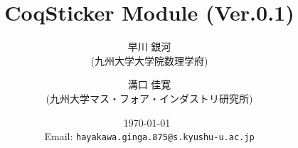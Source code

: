 \documentclass{jreport}
\begin{document}
\title{CoqSticker Module (Ver.0.1)}
\author{早川 銀河 \\ (九州大学大学院数理学府)}
\author{溝口 佳寛 \\ (九州大学マス・フォア・インダストリ研究所)}
\date{\today\ \\ Email: {\tt hayakawa.ginga.875@s.kyushu-u.ac.jp}}

\maketitle

\tableofcontents

  
  
  
  
\end{document}
